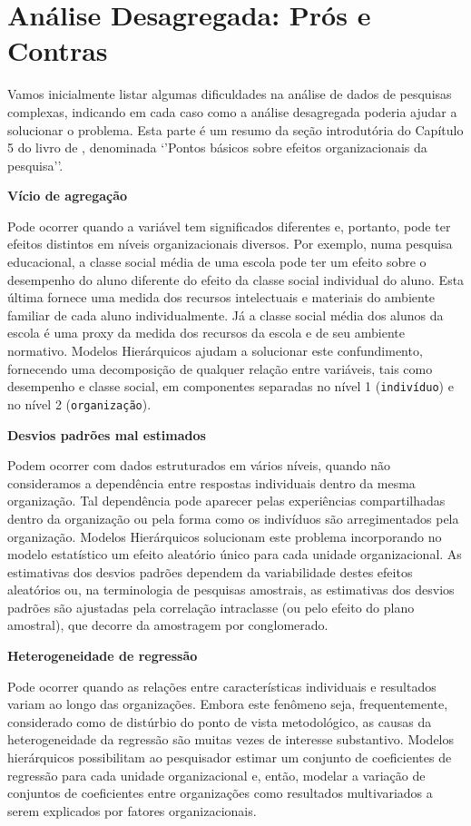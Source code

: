 \documentclass[]{book}
\numberwithin{example}{chapter}
\numberwithin{remark}{chapter}
\numberwithin{definition}{chapter}
\begin{document}
\section{Análise Desagregada: Prós e
Contras}\label{analise-desagregada-pros-e-contras}

Vamos inicialmente listar algumas dificuldades na análise de dados de
pesquisas complexas, indicando em cada caso como a análise desagregada
poderia ajudar a solucionar o problema. Esta parte é um resumo da seção
introdutória do Capítulo 5 do livro de \citep{bryk}, denominada `'Pontos
básicos sobre efeitos organizacionais da pesquisa''.

\textbf{Vício de agregação}

Pode ocorrer quando a variável tem significados diferentes e, portanto,
pode ter efeitos distintos em níveis organizacionais diversos. Por
exemplo, numa pesquisa educacional, a classe social média de uma escola
pode ter um efeito sobre o desempenho do aluno diferente do efeito da
classe social individual do aluno. Esta última fornece uma medida dos
recursos intelectuais e materiais do ambiente familiar de cada aluno
individualmente. Já a classe social média dos alunos da escola é uma
proxy da medida dos recursos da escola e de seu ambiente normativo.
Modelos Hierárquicos ajudam a solucionar este confundimento, fornecendo
uma decomposição de qualquer relação entre variáveis, tais como
desempenho e classe social, em componentes separadas no nível 1
(\texttt{indivíduo}) e no nível 2 (\texttt{organização}).

\textbf{Desvios padrões mal estimados}

Podem ocorrer com dados estruturados em vários níveis, quando não
consideramos a dependência entre respostas individuais dentro da mesma
organização. Tal dependência pode aparecer pelas experiências
compartilhadas dentro da organização ou pela forma como os indivíduos
são arregimentados pela organização. Modelos Hierárquicos solucionam
este problema incorporando no modelo estatístico um efeito aleatório
único para cada unidade organizacional. As estimativas dos desvios
padrões dependem da variabilidade destes efeitos aleatórios ou, na
terminologia de pesquisas amostrais, as estimativas dos desvios padrões
são ajustadas pela correlação intraclasse (ou pelo efeito do plano
amostral), que decorre da amostragem por conglomerado.

\textbf{Heterogeneidade de regressão}

Pode ocorrer quando as relações entre características individuais e
resultados variam ao longo das organizações. Embora este fenômeno seja,
frequentemente, considerado como de distúrbio do ponto de vista
metodológico, as causas da heterogeneidade da regressão são muitas vezes
de interesse substantivo. Modelos hierárquicos possibilitam ao
pesquisador estimar um conjunto de coeficientes de regressão para cada
unidade organizacional e, então, modelar a variação de conjuntos de
coeficientes entre organizações como resultados multivariados a serem
explicados por fatores organizacionais.
\end{document}

